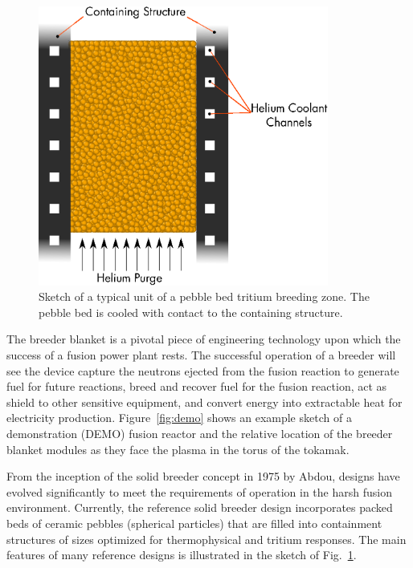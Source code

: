 \begin{figure}[ht]
	\centering
	\includegraphics[width=0.85\textwidth]{chapters/figures/solid_breeder_sketch} 
	\caption{Sketch of a typical unit of a pebble bed tritium breeding zone. The pebble bed is cooled with contact to the containing structure.}
	\label{fig:solid-breeder-sketch}
\end{figure}

The breeder blanket is a pivotal piece of engineering technology upon which the success of a fusion power plant rests. The successful operation of a breeder will see the device capture the neutrons ejected from the fusion reaction to generate fuel for future reactions, breed and recover fuel for the fusion reaction, act as shield to other sensitive equipment, and convert energy into extractable heat for electricity production. Figure~\ref{fig:demo} shows an example sketch of a demonstration (DEMO) fusion reactor and the relative location of the breeder blanket modules as they face the plasma in the torus of the tokamak. 

From the inception of the solid breeder concept in 1975 by Abdou\etal\cite{Abdou1975c}, designs have evolved significantly to meet the requirements of operation in the harsh fusion environment. Currently, the reference solid breeder design incorporates packed beds of ceramic pebbles (spherical particles) that are filled into containment structures of sizes optimized for thermophysical and tritium responses. The main features of many reference designs is illustrated in the sketch of Fig.~\ref{fig:solid-breeder-sketch}.

